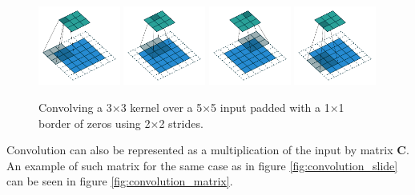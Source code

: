 \begin{figure}[ht]
    \centering
    \includegraphics[width=0.24\textwidth]{images/padding_strides_00.pdf}
    \includegraphics[width=0.24\textwidth]{images/padding_strides_01.pdf}
    \includegraphics[width=0.24\textwidth]{images/padding_strides_02.pdf}
    \includegraphics[width=0.24\textwidth]{images/padding_strides_03.pdf}
    \caption[2D convolution with padding and strides]{\label{fig:convolution_padding_strides}Convolving a 3×3 kernel over a 5×5 input padded with
    a 1×1 border of zeros using 2×2 strides. \cite{convolutionguide}}
\end{figure}

Convolution can also be represented as a multiplication of the input by matrix $\mathbf C $. An example of such matrix for the same case as in figure \ref{fig:convolution_slide}  can be seen in figure \ref{fig:convolution_matrix}.

